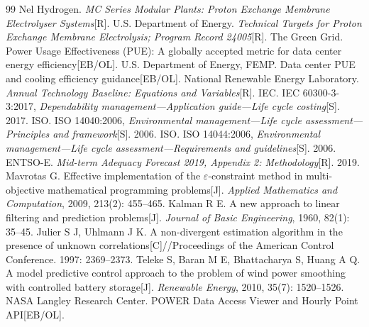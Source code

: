 \begin{thebibliography}{99}
 Nel Hydrogen. \textit{MC Series Modular Plants: Proton Exchange Membrane Electrolyser Systems}[R].
 U.S. Department of Energy. \textit{Technical Targets for Proton Exchange Membrane Electrolysis; Program Record 24005}[R].
 The Green Grid. Power Usage Effectiveness (PUE): A globally accepted metric for data center energy efficiency[EB/OL].
 U.S. Department of Energy, FEMP. Data center PUE and cooling efficiency guidance[EB/OL].
 National Renewable Energy Laboratory. \textit{Annual Technology Baseline: Equations and Variables}[R].
 IEC. IEC 60300-3-3:2017, \textit{Dependability management---Application guide---Life cycle costing}[S]. 2017.
 ISO. ISO 14040:2006, \textit{Environmental management---Life cycle assessment---Principles and framework}[S]. 2006.
 ISO. ISO 14044:2006, \textit{Environmental management---Life cycle assessment---Requirements and guidelines}[S]. 2006.
 ENTSO-E. \textit{Mid-term Adequacy Forecast 2019, Appendix 2: Methodology}[R]. 2019.
 Mavrotas G. Effective implementation of the $\varepsilon$-constraint method in multi-objective mathematical programming problems[J]. \textit{Applied Mathematics and Computation}, 2009, 213(2): 455--465.
 Kalman R E. A new approach to linear filtering and prediction problems[J]. \textit{Journal of Basic Engineering}, 1960, 82(1): 35--45.
 Julier S J, Uhlmann J K. A non-divergent estimation algorithm in the presence of unknown correlations[C]//Proceedings of the American Control Conference. 1997: 2369--2373.
 Teleke S, Baran M E, Bhattacharya S, Huang A Q. A model predictive control approach to the problem of wind power smoothing with controlled battery storage[J]. \textit{Renewable Energy}, 2010, 35(7): 1520--1526.
 NASA Langley Research Center. POWER Data Access Viewer and Hourly Point API[EB/OL].

\end{thebibliography}
